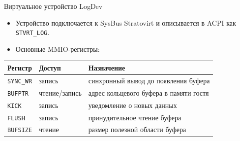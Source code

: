 \documentclass[aspectratio=169, 11pt]{beamer}
\begin{document}
\begin{frame}{Виртуальное устройство LogDev}
    \begin{itemize}
        \item Устройство подключается к SysBus Stratovirt и описывается в ACPI как \texttt{STVRT\_LOG}.
        \item Основные MMIO-регистры:
    \end{itemize}

    \vspace{0.2cm}
    \begin{table}
        \small
        \begin{tabular}{llp{}}
            \toprule
            Регистр & Доступ & Назначение \\
            \midrule
            \texttt{SYNC\_WR} & запись & синхронный вывод до появления буфера \\
            \texttt{BUFPTR} & чтение/запись & адрес кольцевого буфера в памяти гостя \\
            \texttt{KICK} & запись & уведомление о новых данных \\
            \texttt{FLUSH} & запись & принудительное чтение буфера \\
            \texttt{BUFSIZE} & чтение & размер полезной области буфера \\
            \bottomrule
        \end{tabular}
    \end{table}
\end{frame}
\end{document}
